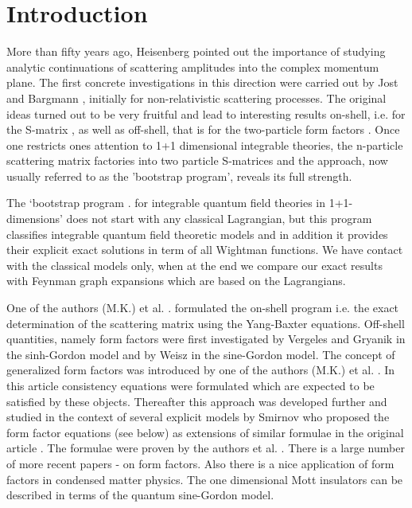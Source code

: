 \documentclass[a4paper,12pt]{article}
\begin{document}
\section{Introduction}

More than fifty years ago, Heisenberg \cite{Heisen} pointed out the
importance of studying analytic continuations of scattering amplitudes into
the complex momentum plane. The first concrete investigations in this
direction were carried out by Jost \cite{Jost} and Bargmann \cite{Bargmann},
initially for non-relativistic scattering processes. The original ideas
turned out to be very fruitful and lead to interesting results on-shell,
i.e. for the S-matrix \cite{ELOP}, as well as off-shell, that is for the
two-particle form factors \cite{Barton}. Once one restricts ones attention to
1+1 dimensional integrable theories, the n-particle scattering matrix
factories into two particle S-matrices and the approach, now usually
referred to as the 'bootstrap program', reveals its full strength.

The `bootstrap program \cite{K2}. for integrable quantum field theories in
1+1-dimensions' does not start with any classical Lagrangian, but this
program classifies integrable quantum field theoretic models and in addition
it provides their explicit exact solutions in term of all Wightman
functions. We have contact with the classical models only, when at the end
we compare our exact results with Feynman graph expansions which are based
on the Lagrangians.

One of the authors (M.K.) et al. \cite{KTTW}. formulated the on-shell program
i.e. the exact determination of the scattering matrix using the Yang-Baxter
equations. Off-shell quantities, namely form factors were first investigated
by Vergeles and Gryanik \cite{VG} in the sinh-Gordon model and by Weisz \cite
{W} in the sine-Gordon model. The concept of generalized form factors was
introduced by one of the authors (M.K.) et al. \cite{KW}. In this article
consistency equations were formulated which are expected to be satisfied by
these objects. Thereafter this approach was developed further and studied in
the context of several explicit models by Smirnov \cite{Sm} who proposed the
form factor equations \coordHE{} (see below) as extensions of similar
formulae in the original article \cite{KW}. The formulae were proven by the
authors et al. \cite{BFKZ}. There is a large number of more recent papers 
\cite{CM}-\cite{BK2} on form factors. Also there is a nice application \cite
{GNT,CET} of form factors in condensed matter physics. The one dimensional
Mott insulators can be described in terms of the quantum sine-Gordon model.
\end{document}
